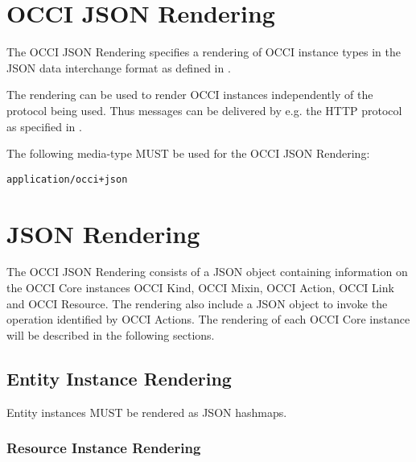 \documentclass[10pt,a4paper]{article}
\begin{document}
\section{OCCI JSON Rendering}

The OCCI JSON Rendering specifies a rendering of OCCI instance types in the JSON
data interchange format as defined in \cite{rfc4627}.

The rendering can be used to render OCCI instances independently of the
protocol being used. Thus messages can be delivered by e.g. the HTTP
protocol as specified in \cite{occi:http_rendering}.

The following media-type MUST be used for the OCCI JSON Rendering:

{\tt application/occi+json}

\section{JSON Rendering}
\label{sec:json_format}
The OCCI JSON Rendering consists of a JSON object containing information on the 
OCCI Core instances OCCI Kind, OCCI Mixin, OCCI Action,
OCCI Link and OCCI Resource. The rendering also include a JSON object to invoke
the operation identified by OCCI Actions.
The rendering of each OCCI Core instance will be
described in the following sections. 

\subsection{Entity Instance Rendering}
\label{sec:format_entity_instance_rendering}

Entity instances MUST be rendered as JSON hashmaps.

\subsubsection{Resource Instance Rendering}
\label{sec:format_resource}
\end{document}

